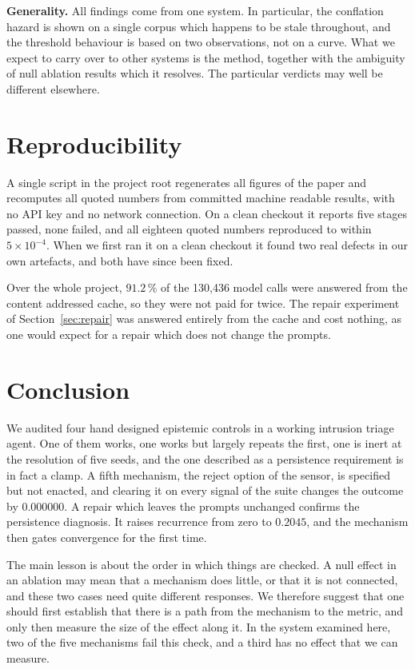 \documentclass[conference]{IEEEtran}
\begin{document}
\textbf{Generality.} All findings come from one system. In particular, the
conflation hazard is shown on a single corpus which happens to be stale
throughout, and the threshold behaviour is based on two observations, not on a
curve. What we expect to carry over to other systems is the method, together
with the ambiguity of null ablation results which it resolves. The particular
verdicts may well be different elsewhere.

\section{Reproducibility}

A single script in the project root regenerates all figures of the paper and
recomputes all quoted numbers from committed machine readable results, with no
API key and no network connection. On a clean checkout it reports five stages
passed, none failed, and all eighteen quoted numbers reproduced to within
$5 \times 10^{-4}$. When we first ran it on a clean checkout it found two real
defects in our own artefacts, and both have since been fixed.

Over the whole project, $91.2$\,\% of the 130{,}436 model calls were answered
from the content addressed cache, so they were not paid for twice. The repair
experiment of Section~\ref{sec:repair} was answered entirely from the cache and
cost nothing, as one would expect for a repair which does not change the
prompts.

\section{Conclusion}

We audited four hand designed epistemic controls in a working intrusion
triage agent. One of them works, one works but largely repeats the first, one
is inert at the resolution of five seeds, and the one described as a
persistence requirement is in fact a clamp. A fifth mechanism, the reject
option of the sensor, is specified but not enacted, and clearing it on every
signal of the suite changes the outcome by $0.000000$. A repair which leaves
the prompts unchanged confirms the persistence diagnosis. It raises recurrence
from zero to $0.2045$, and the mechanism then gates convergence for the first
time.

The main lesson is about the order in which things are checked. A null effect
in an ablation may mean that a mechanism does little, or that it is not
connected, and these two cases need quite different responses. We therefore
suggest that one should first establish that there is a path from the
mechanism to the metric, and only then measure the size of the effect along
it. In the system examined here, two of the five mechanisms fail this check,
and a third has no effect that we can measure.

\balance


\end{document}
